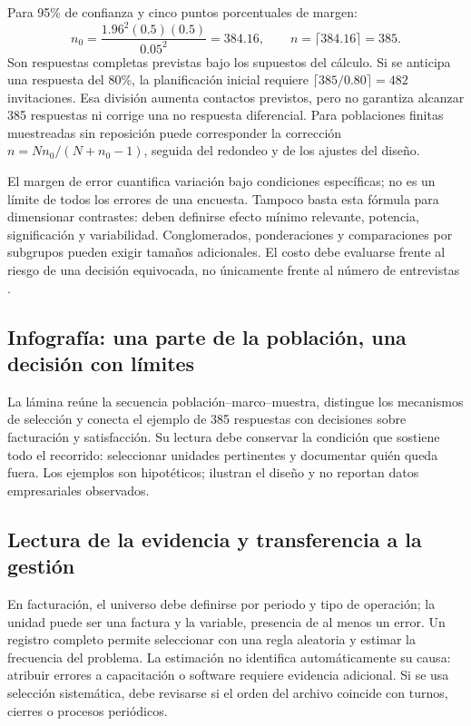 {Para 95\% de confianza y cinco puntos porcentuales de margen:
\[
 n_0=\frac{1.96^2(0.5)(0.5)}{0.05^2}=384.16,
 \qquad n=\lceil384.16\rceil=385.
\]
Son respuestas completas previstas bajo los supuestos del cálculo. Si se anticipa una respuesta del 80\%, la planificación inicial requiere $\lceil385/0.80\rceil=482$ invitaciones. Esa división aumenta contactos previstos, pero no garantiza alcanzar 385 respuestas ni corrige una no respuesta diferencial. Para poblaciones finitas muestreadas sin reposición puede corresponder la corrección $n=Nn_0/(N+n_0-1)$, seguida del redondeo y de los ajustes del diseño.

El margen de error cuantifica variación bajo condiciones específicas; no es un límite de todos los errores de una encuesta. Tampoco basta esta fórmula para dimensionar contrastes: deben definirse efecto mínimo relevante, potencia, significación y variabilidad. Conglomerados, ponderaciones y comparaciones por subgrupos pueden exigir tamaños adicionales. El costo debe evaluarse frente al riesgo de una decisión equivocada, no únicamente frente al número de entrevistas \citep{nistHandbook,wackerly2010}.

\subsection{Infografía: una parte de la población, una decisión con límites}
La lámina reúne la secuencia población--marco--muestra, distingue los mecanismos de selección y conecta el ejemplo de 385 respuestas con decisiones sobre facturación y satisfacción. Su lectura debe conservar la condición que sostiene todo el recorrido: seleccionar unidades pertinentes y documentar quién queda fuera. Los ejemplos son hipotéticos; ilustran el diseño y no reportan datos empresariales observados.



\subsection{Lectura de la evidencia y transferencia a la gestión}
En facturación, el universo debe definirse por periodo y tipo de operación; la unidad puede ser una factura y la variable, presencia de al menos un error. Un registro completo permite seleccionar con una regla aleatoria y estimar la frecuencia del problema. La estimación no identifica automáticamente su causa: atribuir errores a capacitación o software requiere evidencia adicional. Si se usa selección sistemática, debe revisarse si el orden del archivo coincide con turnos, cierres o procesos periódicos.

}
